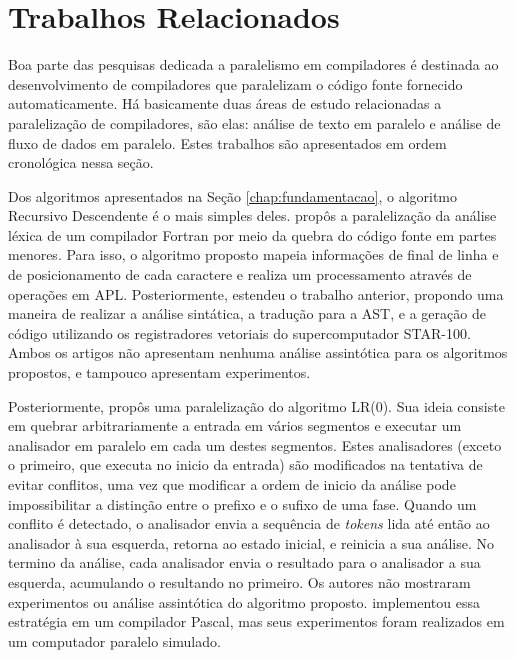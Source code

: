 
\newcommand{\sla}{\textbackslash}

\newcommand{\cmd}[1]{\textsf{#1}}

\newcommand{\pkg}[1]{\textsf{#1}}

\newcommand{\ltxcmd}[1]{\cmd{\sla{}#1}}

\chapter{Trabalhos Relacionados}
\label{chap:related_works}

Boa parte das pesquisas dedicada a paralelismo
em compiladores é destinada ao desenvolvimento de compiladores que
paralelizam o código fonte fornecido automaticamente.
Há basicamente
duas áreas de estudo relacionadas a paralelização de compiladores, são
elas: análise de texto em paralelo e análise de fluxo de dados em paralelo.
Estes trabalhos são apresentados em ordem cronológica nessa seção.

Dos algoritmos apresentados na Seção \ref{chap:fundamentacao}, o algoritmo
Recursivo Descendente é o mais simples deles. \cite{Lincoln:1970:PPT:987475.987478}
propôs a paralelização da análise léxica de um compilador
Fortran por meio da quebra do código fonte em partes menores. Para isso, o algoritmo proposto mapeia
informações de final de
linha e de posicionamento de cada caractere e realiza um processamento através de operações em APL.
Posteriormente, \cite{Krohn:1975:PAC:390015.808414} estendeu o trabalho
anterior, propondo uma maneira de realizar a análise sintática, a
tradução para a AST, e a geração
de código utilizando os registradores vetoriais do supercomputador
STAR-100. Ambos os artigos não apresentam nenhuma
análise assintótica para os algoritmos propostos, e tampouco apresentam
experimentos.

Posteriormente, \cite{Mickunas:1978:PCM:800127.804105} propôs uma
paralelização do algoritmo LR($0$). Sua ideia consiste em quebrar
arbitrariamente a entrada em vários segmentos e executar um analisador em paralelo
em cada um destes segmentos. Estes analisadores (exceto o primeiro,
que executa no inicio da entrada) são modificados na tentativa de
evitar conflitos, uma vez que modificar a ordem de inicio da análise
pode impossibilitar a distinção entre o prefixo e o sufixo de uma fase.
Quando um conflito é detectado, o analisador envia a sequência de
\textit{tokens} lida até então ao analisador à sua esquerda,
retorna ao estado inicial, e reinicia a sua análise.
No termino da análise, cada analisador envia o resultado para o analisador
a sua esquerda, acumulando o resultando no primeiro.
Os autores não mostraram experimentos ou
análise assintótica do algoritmo proposto. \cite{Pennello:1978:FMA:512760.512786}
implementou essa estratégia em um compilador Pascal, mas seus experimentos foram
realizados em um computador paralelo simulado.

